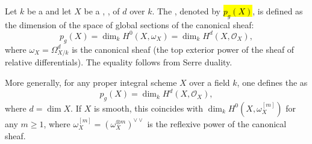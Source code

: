 \begin{definition} \label{definition:geometric_genus_of_a_smooth_projective_variety_over_a_field}
    Let $k$ be a  and let $X$ be a , ,   of  $d$ over $k$. 
    The , denoted by \hl{$p_g(X)$}, is defined as the dimension of the space of global sections of the canonical sheaf:
    $$p_g(X) = \dim_k H^0(X, \omega_X) = \dim_k H^d(X, \mathcal{O}_X),$$
    where $\omega_X = \Omega_{X/k}^d$ is the canonical sheaf (the top exterior power of the sheaf of relative differentials). The equality follows from Serre duality.

    More generally, for any proper integral scheme $X$ over a field $k$, one defines the  as
    $$p_g(X) = \dim_k H^d(X, \mathcal{O}_X),$$
    where $d = \dim X$. If $X$ is smooth, this coincides with $\dim_k H^0(X, \omega_X^{[m]})$ for any $m \geq 1$, where $\omega_X^{[m]} = (\omega_X^{\otimes m})^{\vee\vee}$ is the reflexive power of the canonical sheaf.

\end{definition}
